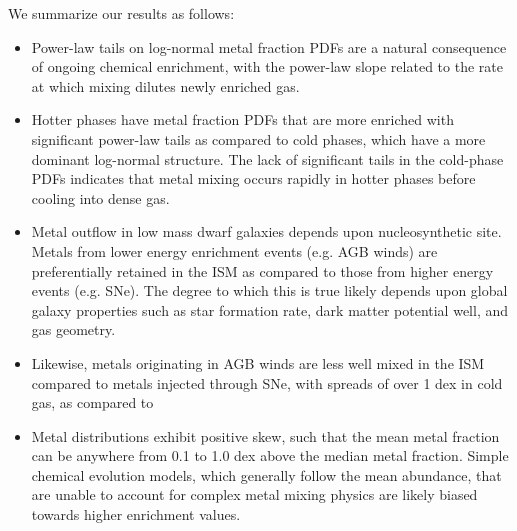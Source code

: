 \documentclass[twocolumn]{aastex61}
\begin{document}
We summarize our results as follows:
\begin{itemize}



\item Power-law tails 
   on log-normal 
metal fraction PDFs are a natural consequence of ongoing chemical enrichment, with the power-law slope related to the rate at which mixing dilutes newly enriched gas.

\item Hotter phases have metal fraction PDFs that are more enriched with significant power-law tails as compared to cold phases, which have a more dominant log-normal structure. The lack of significant tails in the cold-phase PDFs indicates that metal mixing occurs rapidly in hotter phases before cooling into dense gas. %

\item Metal outflow in low mass dwarf galaxies depends upon nucleosynthetic site. Metals from lower energy enrichment events (e.g. AGB winds) are preferentially retained in the ISM as compared to those from higher energy events (e.g. SNe). The degree to which this is true likely depends upon global galaxy properties such as star formation rate, dark matter potential well, and gas geometry.

\item Likewise, metals originating in AGB winds are less well mixed in the ISM compared to metals injected through SNe, with spreads of over 1 dex in cold gas, as compared to

\item Metal distributions exhibit positive skew, such that the mean metal fraction can be anywhere from 0.1 to 1.0 dex above the median metal fraction. Simple chemical evolution models, which generally follow the mean abundance, that are unable to account for complex metal mixing physics are likely biased towards higher enrichment values.


\end{itemize}
\end{document}
